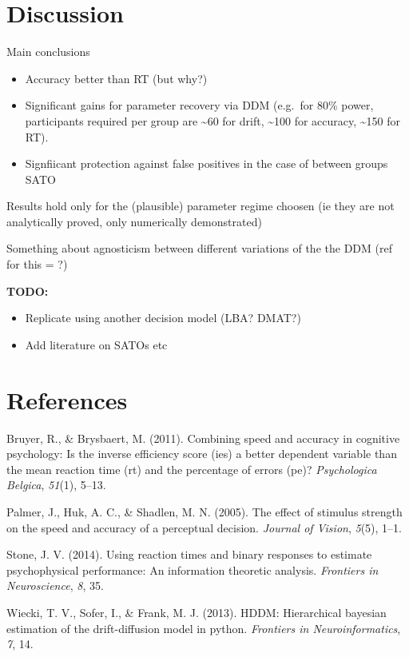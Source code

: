 \documentclass[floatsintext,doc]{apa6}
\providecommand{\tightlist}{%
  \setlength{\itemsep}{0pt}\setlength{\parskip}{0pt}}
\theoremstyle{definition}
\theoremstyle{definition}
\theoremstyle{definition}
\theoremstyle{remark}
\begin{document}
\section{Discussion}\label{discussion}

Main conclusions

\begin{itemize}
\item
  Accuracy better than RT (but why?)
\item
  Significant gains for parameter recovery via DDM (e.g.~for 80\% power,
  participants required per group are \textasciitilde{}60 for drift,
  \textasciitilde{}100 for accuracy, \textasciitilde{}150 for RT).
\item
  Signfiicant protection against false positives in the case of between
  groups SATO
\end{itemize}

Results hold only for the (plausible) parameter regime choosen (ie they
are not analytically proved, only numerically demonstrated)

Something about agnosticism between different variations of the the DDM
(ref for this = ?)

\textbf{TODO:}

\begin{itemize}
\tightlist
\item
  Replicate using another decision model (LBA? DMAT?)
\item
  Add literature on SATOs etc
\end{itemize}

\section*{References}\label{references}

\hypertarget{refs}{}
\hypertarget{ref-bruyer2011combining}{}
Bruyer, R., \& Brysbaert, M. (2011). Combining speed and accuracy in
cognitive psychology: Is the inverse efficiency score (ies) a better
dependent variable than the mean reaction time (rt) and the percentage
of errors (pe)? \emph{Psychologica Belgica}, \emph{51}(1), 5--13.

\hypertarget{ref-palmer2005effect}{}
Palmer, J., Huk, A. C., \& Shadlen, M. N. (2005). The effect of stimulus
strength on the speed and accuracy of a perceptual decision.
\emph{Journal of Vision}, \emph{5}(5), 1--1.

\hypertarget{ref-stone2014using}{}
Stone, J. V. (2014). Using reaction times and binary responses to
estimate psychophysical performance: An information theoretic analysis.
\emph{Frontiers in Neuroscience}, \emph{8}, 35.

\hypertarget{ref-wiecki2013hddm}{}
Wiecki, T. V., Sofer, I., \& Frank, M. J. (2013). HDDM: Hierarchical
bayesian estimation of the drift-diffusion model in python.
\emph{Frontiers in Neuroinformatics}, \emph{7}, 14.
\end{document}
